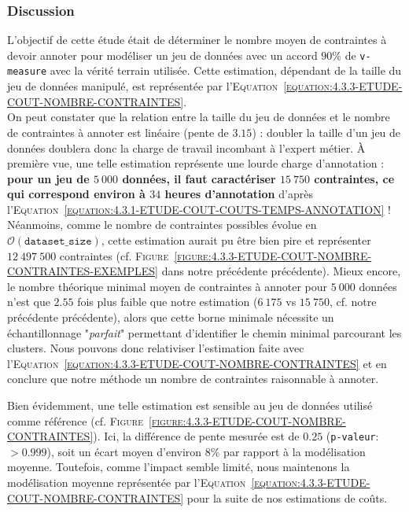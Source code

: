 		\subsubsection{Discussion}
		
			L'objectif de cette étude était de déterminer le nombre moyen de contraintes à devoir annoter pour modéliser un jeu de données avec un accord $90$\% de \texttt{v-measure} avec la vérité terrain utilisée.
			Cette estimation, dépendant de la taille du jeu de données manipulé, est représentée par l'\textsc{Equation~\ref{equation:4.3.3-ETUDE-COUT-NOMBRE-CONTRAINTES}}.
			\\
			
			On peut constater que la relation entre la taille du jeu de données et le nombre de contraintes à annoter est linéaire (pente de $3.15$) : doubler la taille d'un jeu de données doublera donc la charge de travail incombant à l'expert métier.
			À première vue, une telle estimation représente une lourde charge d'annotation : \textbf{pour un jeu de $5~000$ données, il faut caractériser $15~750$ contraintes, ce qui correspond environ à $34$ heures d'annotation} d'après l'\textsc{Equation~\ref{equation:4.3.1-ETUDE-COUT-COUTS-TEMPS-ANNOTATION}} !
			Néanmoins, comme le nombre de contraintes possibles évolue en $ \mathcal{O}(\texttt{dataset\_size}) $, cette estimation aurait pu être bien pire et représenter $12~497~500$ contraintes (cf. \textsc{Figure~\ref{figure:4.3.3-ETUDE-COUT-NOMBRE-CONTRAINTES-EXEMPLES}} dans notre précédente précédente).
			Mieux encore, le nombre théorique minimal moyen de contraintes à annoter pour $5~000$ données n'est que $2.55$ fois plus faible que notre estimation ($6~175$ vs $15~750$, cf. notre précédente précédente), alors que cette borne minimale nécessite un échantillonnage "\textit{parfait}" permettant d'identifier le chemin minimal parcourant les clusters.
			Nous pouvons donc relativiser l'estimation faite avec l'\textsc{Equation~\ref{equation:4.3.3-ETUDE-COUT-NOMBRE-CONTRAINTES}} et en conclure que notre méthode un nombre de contraintes raisonnable à annoter.
			
			Bien évidemment, une telle estimation est sensible au jeu de données utilisé comme référence (cf. \textsc{Figure~\ref{figure:4.3.3-ETUDE-COUT-NOMBRE-CONTRAINTES}}).
			Ici, la différence de pente mesurée est de $0.25$ (\texttt{p-valeur}: $> 0.999$), soit un écart moyen d'environ $8$\% par rapport à la modélisation moyenne.
			Toutefois, comme l'impact semble limité, nous maintenons la modélisation moyenne représentée par l'\textsc{Equation~\ref{equation:4.3.3-ETUDE-COUT-NOMBRE-CONTRAINTES}} pour la suite de nos estimations de coûts.
		
